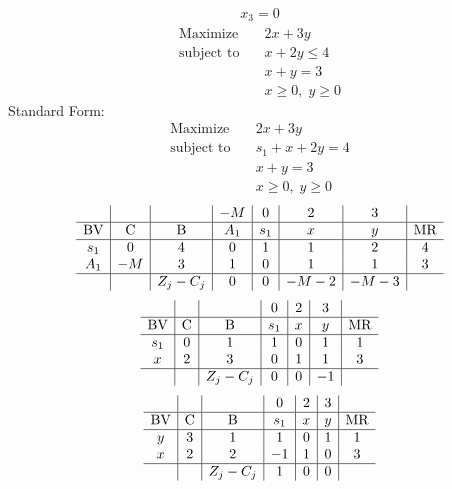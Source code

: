 \documentclass{article}
\begin{document}
\begin{align*}
x_{3}=0\end{align*}
\begin{align*}
\text{Maximize} \quad & 2x + 3y\\
\text{subject to} \quad
& x + 2y\le4\\
& x + y=3\\
& x\ge0,\; y\ge0\end{align*}
Standard Form:\\
\begin{align*}
\text{Maximize} \quad & 2x + 3y\\
\text{subject to} \quad
& s_{1} + x + 2y=4\\
& x + y=3\\
& x\ge0,\; y\ge0\end{align*}
\begin{align*}
\begin{array}{c|c|c|c|c|c|c|c}
 &  &  & -M & 0 & 2 & 3 & \\
\hline
\text{BV} & \text{C} & \text{B} & A_{1} & s_{1} & x & y & \text{MR} \\
\hline
s_{1} & 0 & 4 & 0 & 1 & 1 & 2 & 4 \\
A_{1} & -M & 3 & 1 & 0 & 1 & 1 & 3 \\
\hline
 &  & Z_j-C_j & 0 & 0 & -M - 2 & -M - 3 & \\
\end{array}
\end{align*}
\begin{align*}
\begin{array}{c|c|c|c|c|c|c}
 &  &  & 0 & 2 & 3 & \\
\hline
\text{BV} & \text{C} & \text{B} & s_{1} & x & y & \text{MR} \\
\hline
s_{1} & 0 & 1 & 1 & 0 & 1 & 1 \\
x & 2 & 3 & 0 & 1 & 1 & 3 \\
\hline
 &  & Z_j-C_j & 0 & 0 & -1 & \\
\end{array}
\end{align*}
\begin{align*}
\begin{array}{c|c|c|c|c|c|c}
 &  &  & 0 & 2 & 3 & \\
\hline
\text{BV} & \text{C} & \text{B} & s_{1} & x & y & \text{MR} \\
\hline
y & 3 & 1 & 1 & 0 & 1 & 1 \\
x & 2 & 2 & -1 & 1 & 0 & 3 \\
\hline
 &  & Z_j-C_j & 1 & 0 & 0 & \\
\end{array}
\end{align*}
\end{document}
